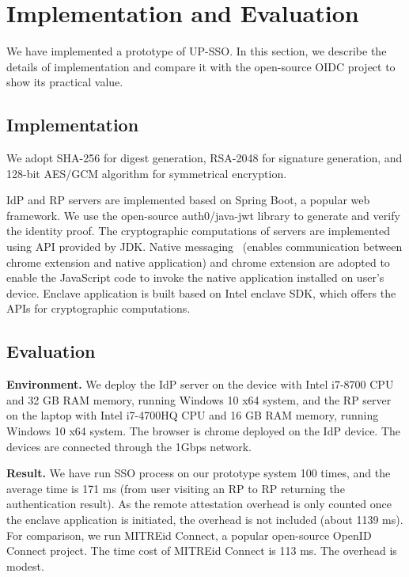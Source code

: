 \section{Implementation and Evaluation}
\label{sec:implementation}
We have implemented  a prototype of UP-SSO.
In this section, we describe the details of implementation and compare it with the open-source OIDC project to show its practical value.
\subsection{Implementation}
We adopt SHA-256 for digest generation, RSA-2048 for signature generation, and 128-bit AES/GCM algorithm for symmetrical encryption. 


IdP and RP servers are implemented based on Spring Boot, a popular web framework. 
We use the open-source auth0/java-jwt library to generate and verify the identity proof. 
The cryptographic computations of servers are implemented using API provided by JDK. 
Native messaging~\cite{NativeMessaging} (enables communication between chrome extension and native application) and chrome extension are  adopted to enable the JavaScript code to invoke the native application installed on user's device. 
Enclave application is built based on Intel enclave SDK,
which offers the APIs for cryptographic computations.%

\subsection{Evaluation}
\noindent\textbf{Environment.}
We deploy the IdP server on the device with Intel i7-8700 CPU and 32 GB RAM memory, running Windows 10 x64 system, and the RP server on the laptop with Intel i7-4700HQ CPU and 16 GB RAM memory, running Windows 10 x64 system. 
The browser is chrome deployed on the IdP device.  The devices are connected through the 1Gbps network. 



\vspace{1mm}\noindent\textbf{Result.}
We have run SSO process on our prototype system 100 times, and the average time is 171 ms (from user visiting an RP to RP returning the authentication result). As the remote attestation overhead is only counted once the enclave application is initiated, the overhead is not included (about 1139 ms). For comparison, we run MITREid Connect, a popular open-source OpenID Connect project. The time cost of  MITREid Connect is 113 ms. The overhead is modest.
